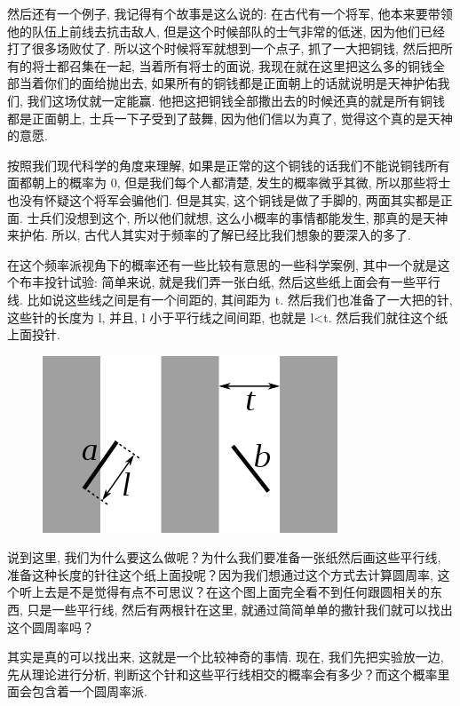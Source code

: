 然后还有一个例子, 我记得有个故事是这么说的: 在古代有一个将军, 他本来要带领他的队伍上前线去抗击敌人, 但是这个时候部队的士气非常的低迷, 因为他们已经打了很多场败仗了. 所以这个时候将军就想到一个点子, 抓了一大把铜钱, 然后把所有的将士都召集在一起, 当着所有将士的面说, 我现在就在这里把这么多的铜钱全部当着你们的面给抛出去, 如果所有的铜钱都是正面朝上的话就说明是天神护佑我们, 我们这场仗就一定能赢. 他把这把铜钱全部撒出去的时候还真的就是所有铜钱都是正面朝上, 士兵一下子受到了鼓舞, 因为他们信以为真了, 觉得这个真的是天神的意愿. 

按照我们现代科学的角度来理解, 如果是正常的这个铜钱的话我们不能说铜钱所有面都朝上的概率为 0, 但是我们每个人都清楚, 发生的概率微乎其微, 所以那些将士也没有怀疑这个将军会骗他们. 但是其实, 这个铜钱是做了手脚的, 两面其实都是正面. 士兵们没想到这个, 所以他们就想, 这么小概率的事情都能发生, 那真的是天神来护佑. 所以, 古代人其实对于频率的了解已经比我们想象的要深入的多了. 

在这个频率派视角下的概率还有一些比较有意思的一些科学案例, 其中一个就是这个布丰投针试验: 简单来说, 就是我们弄一张白纸, 然后这些纸上面会有一些平行线. 比如说这些线之间是有一个间距的, 其间距为 t. 然后我们也准备了一大把的针, 这些针的长度为 l, 并且, l 小于平行线之间间距, 也就是 l<t. 然后我们就往这个纸上面投针. 

\begin{figure}[ht]
  \centering
  \includegraphics[width=0.6\linewidth]{asset/20230916012927.png}
  \caption{}
  \label{fig:img20_3}
\end{figure}

说到这里, 我们为什么要这么做呢？为什么我们要准备一张纸然后画这些平行线, 准备这种长度的针往这个纸上面投呢？因为我们想通过这个方式去计算圆周率, 这个听上去是不是觉得有点不可思议？在这个图上面完全看不到任何跟圆相关的东西, 只是一些平行线, 然后有两根针在这里, 就通过简简单单的撒针我们就可以找出这个圆周率吗？

其实是真的可以找出来, 这就是一个比较神奇的事情. 现在, 我们先把实验放一边, 先从理论进行分析, 判断这个针和这些平行线相交的概率会有多少？而这个概率里面会包含着一个圆周率派. 

